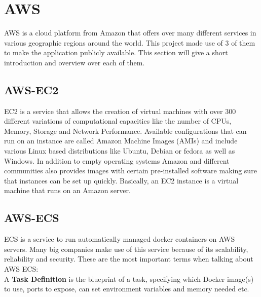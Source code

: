 \section{AWS}
AWS is a cloud platform from Amazon that offers over many different services in various geographic regions around the world. This project made use of 3 of them to make the application publicly available. This section will give a short introduction and overview over each of them.

\subsection{AWS-EC2}
EC2 is a service that allows the creation of virtual machines with over 300 different variations of computational capacities like the number of CPUs, Memory, Storage and Network Performance. \cite{AwsEc2} 
Available configurations that can run on an instance are called Amazon Machine Images (AMIs) and include various Linux based distributions like Ubuntu, Debian or fedora as well as Windows. In addition to empty operating systems Amazon and different communities also provides images with certain pre-installed software making sure that instances can be set up quickly.
Basically, an EC2 instance is a virtual machine that runs on an Amazon server. \cite{Ec2VirtualMachine}

\newpage
\subsection{AWS-ECS}
ECS is a service to run automatically managed docker containers on AWS servers. Many big companies make use of this service because of its scalability, reliability and security. \cite{AwsEc2}
These are the most important terms when talking about AWS ECS: \\

A \textbf{Task Definition} is the blueprint of a task, specifying which Docker image(s) to use, ports to expose, can set environment variables and memory needed etc. \cite{CodeCampEcs}

